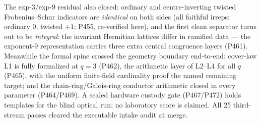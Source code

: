 \documentclass[12pt,a4paper]{article}
\theoremstyle{definition}
\begin{document}
The exp-$3$/exp-$9$ residual also closed: ordinary and centre-inverting
twisted Frobenius--Schur indicators are \emph{identical} on both sides
(all faithful irreps: ordinary $0$, twisted $+1$; P455, re-verified here),
and the first clean separator turns out to be \emph{integral}: the invariant
Hermitian lattices differ in ramified data --- the exponent-$9$
representation carries three extra central congruence layers (P461).
Meanwhile the formal spine crossed the geometry boundary end-to-end: cover-law
L1 is fully formalized at $q=3$ (P462), the arithmetic layer of L2--L4 for
all $q$ (P465), with the uniform finite-field cardinality proof the named
remaining target; and the chain-ring/Galois-ring conductor arithmetic closed
in every parameter (P464/P469).  A sealed hardware custody gate (P467/P472)
holds templates for the blind optical run; no laboratory score is claimed.
All 25 third-stream passes cleared the executable intake audit at merge.
\end{document}
